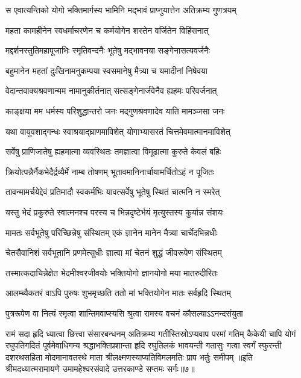 \twolineshloka
{स एवात्यन्तिको योगो भक्तिमार्गस्य भामिनि}
{मद्भावं प्राप्नुयात्तेन अतिक्रम्य गुणत्रयम्} %

\twolineshloka
{महता कामहीनेन स्वधर्माचरणेन च}
{कर्मयोगेन शस्तेन वर्जितेन विहिंसनात्} %

\twolineshloka
{मद्दर्शनस्तुतिमहापूजाभिः स्मृतिवन्दनैः}
{भूतेषु मद्भावनया सङ्गेनासत्यवर्जनैः} %

\twolineshloka
{बहुमानेन महतां दुःखिनामनुकम्पया}
{स्वसमानेषु मैत्र्या च यमादीनां निषेवया} %

\twolineshloka
{वेदान्तवाक्यश्रवणान्मम नामानुकीर्तनात्}
{सत्सङ्गेनार्जवेनैव ह्यहमः परिवर्जनात्} %

\twolineshloka
{काङ्क्षया मम धर्मस्य परिशुद्धान्तरो जनः}
{मद्गुणश्रवणादेव याति मामञ्जसा जनः} %

\twolineshloka
{यथा वायुवशाद्गन्धः स्वाश्रयाद्\mbox{}घ्राणमाविशेत्}
{योगाभ्यासरतं चित्तमेवमात्मानमाविशेत्} %

\twolineshloka
{सर्वेषु प्राणिजातेषु ह्यहमात्मा व्यवस्थितः}
{तमज्ञात्वा विमूढात्मा कुरुते केवलं बहिः} %

\twolineshloka
{क्रियोत्पन्नैर्नैकभेदैर्द्रव्यैर्मे नाम्ब तोषणम्}
{भूतावमानिनार्चायामर्चितोऽहं न पूजितः} %

\twolineshloka
{तावन्मामर्चयेद्देवं प्रतिमादौ स्वकर्मभिः}
{यावत्सर्वेषु भूतेषु स्थितं चात्मनि न स्मरेत्} %

\twolineshloka
{यस्तु भेदं प्रकुरुते स्वात्मनश्च परस्य च}
{भिन्नदृष्टेर्भयं मृत्युस्तस्य कुर्यान्न संशयः} %

\twolineshloka
{मामतः सर्वभूतेषु परिच्छिन्नेषु संस्थितम्}
{एकं ज्ञानेन मानेन मैत्र्या चार्चेदभिन्नधीः} %

\twolineshloka
{चेतसैवानिशं सर्वभूतानि प्रणमेत्सुधीः}
{ज्ञात्वा मां चेतनं शुद्धं जीवरूपेण संस्थितम्} %

\twolineshloka
{तस्मात्कदाचिन्नेक्षेत भेदमीश्वरजीवयोः}
{भक्तियोगो ज्ञानयोगो मया मातरुदीरितः} %

\twolineshloka
{आलम्ब्यैकतरं वाऽपि पुरुषः शुभमृच्छति}
{ततो मां भक्तियोगेन मातः सर्वहृदि स्थितम्} %

\twolineshloka
{पुत्ररूपेण वा नित्यं स्मृत्वा शान्तिमवाप्स्यसि}
{श्रुत्वा रामस्य वचनं कौसल्याऽऽनन्दसंयुता} %

\twolineshloka
{रामं सदा हृदि ध्यात्वा छित्त्वा संसारबन्धनम्}
{अतिक्रम्य गतीस्तिस्रोऽप्यवाप परमां गतिम्} %
\setlength{\shlokaspaceskip}{10pt}
\fourlineindentedshloka
{कैकेयी चापि योगं रघुपतिगदितं पूर्वमेवाधिगम्य}
{श्रद्धाभक्तिप्रशान्ता हृदि रघुतिलकं भावयन्ती गतासुः}
{गत्वा स्वर्गं स्फुरन्ती दशरथसहिता मोदमानावतस्थे}
{माता श्रीलक्ष्मणस्याप्यतिविमलमतिः प्राप भर्तुः समीपम्} %
\setlength{\shlokaspaceskip}{24pt}
{॥इति श्रीमदध्यात्मरामायणे उमामहेश्वरसंवादे उत्तरकाण्डे सप्तमः
सर्गः॥७॥
}



